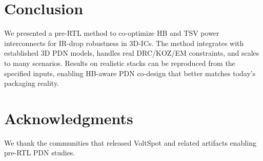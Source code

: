 \documentclass[conference]{IEEEtran}
\begin{document}
\section{Conclusion}
We presented a pre-RTL method to co-optimize HB and TSV power interconnects for IR-drop robustness in 3D-ICs. The method integrates with established 3D PDN models, handles real DRC/KOZ/EM constraints, and scales to many scenarios. Results on realistic stacks can be reproduced from the specified inputs, enabling HB-aware PDN co-design that better matches today’s packaging reality.

\section*{Acknowledgments}
We thank the communities that released VoltSpot and related artifacts enabling pre-RTL PDN studies.
\end{document}
